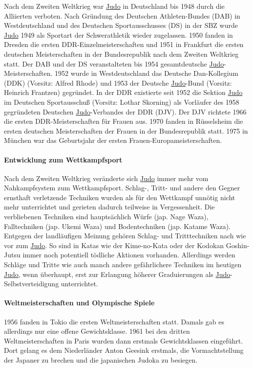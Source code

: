 \documentclass[justified, a4paper, notitlepage, captions=tableheading, nobib]{tufte-handout}
\begin{document}
Nach dem Zweiten Weltkrieg war \hyperref[org80c3996]{Judo} in Deutschland bis 1948 durch die Alliierten verboten. Nach Gründung des Deutschen Athleten-Bundes (DAB) in Westdeutschland und des Deutschen Sportausschusses (DS) in der SBZ wurde \hyperref[org80c3996]{Judo} 1949 als Sportart der Schwerathletik wieder zugelassen. 1950 fanden in Dresden die ersten DDR-Einzelmeisterschaften und 1951 in Frankfurt die ersten deutschen Meisterschaften in der Bundesrepublik nach dem Zweiten Weltkrieg statt. Der DAB und der DS veranstalteten bis 1954 gesamtdeutsche \hyperref[org80c3996]{Judo}-Meisterschaften. 1952 wurde in Westdeutschland das Deutsche Dan-Kollegium (DDK) (Vorsitz: Alfred Rhode) und 1953 der Deutsche \hyperref[org80c3996]{Judo}-Bund (Vorsitz: Heinrich Frantzen) gegründet. In der DDR existierte seit 1952 die Sektion \hyperref[org80c3996]{Judo} im Deutschen Sportausschuß (Vorsitz: Lothar Skorning) als Vorläufer des 1958 gegründeten Deutschen \hyperref[org80c3996]{Judo}-Verbandes der DDR (DJV). Der DJV richtete 1966 die ersten DDR-Meisterschaften für Frauen aus. 1970 fanden in Rüsselsheim die ersten deutschen Meisterschaften der Frauen in der Bundesrepublik statt. 1975 in München war das Geburtsjahr der ersten Frauen-Europameisterschaften.

\paragraph{Entwicklung zum Wettkampfsport}
\label{sec:orgfab356c}
Nach dem Zweiten Weltkrieg veränderte sich \hyperref[org80c3996]{Judo} immer mehr vom Nahkampfsystem zum Wettkampfsport. Schlag-, Tritt- und andere den Gegner ernsthaft verletzende Techniken wurden als für den Wettkampf unnötig nicht mehr unterrichtet und gerieten dadurch teilweise in Vergessenheit. Die verbliebenen Techniken sind hauptsächlich Würfe (jap. Nage Waza), Falltechniken (jap. Ukemi Waza) und Bodentechniken (jap. Katame Waza). Entgegen der landläufigen Meinung gehören Schlag- und Tritttechniken nach wie vor zum \hyperref[org80c3996]{Judo}. So sind in Katas wie der Kime-no-Kata oder der Kodokan Goshin-Jutsu immer noch potentiell tödliche Aktionen vorhanden. Allerdings werden Schläge und Tritte wie auch manch andere gefährlichere Techniken im heutigen \hyperref[org80c3996]{Judo}, wenn überhaupt, erst zur Erlangung höherer Graduierungen als \hyperref[org80c3996]{Judo}-Selbstverteidigung unterrichtet.

\paragraph{Weltmeisterschaften und Olympische Spiele}
\label{sec:org948082b}
1956 fanden in Tokio die ersten Weltmeisterschaften statt. Damals gab es allerdings nur eine offene Gewichtsklasse. 1961 bei den dritten Weltmeisterschaften in Paris wurden dann erstmals Gewichtsklassen eingeführt. Dort gelang es dem Niederländer Anton Geesink erstmals, die Vormachtstellung der Japaner zu brechen und die japanischen Judoka zu besiegen.
\end{document}
